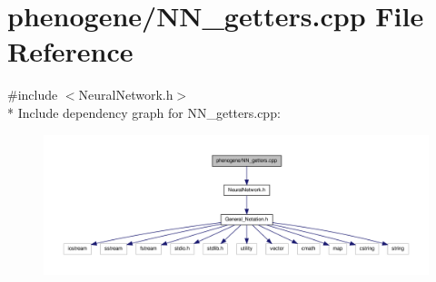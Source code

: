 \hypertarget{a00017}{\section{phenogene/\-N\-N\-\_\-getters.cpp File Reference}
\label{d4/d51/a00017}
}
{\ttfamily \#include $<$Neural\-Network.\-h$>$}\\*
Include dependency graph for N\-N\-\_\-getters.\-cpp\-:\nopagebreak
\begin{figure}[H]
\begin{center}
\leavevmode
\includegraphics[width=350pt]{d3/de7/a00039}
\end{center}
\end{figure}
